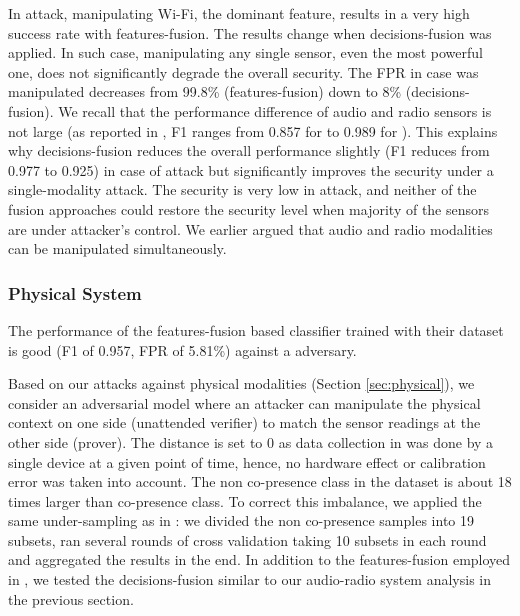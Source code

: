 In \singlemodal attack, manipulating Wi-Fi, the dominant feature, results in a
very high success rate with features-fusion. The results change when
decisions-fusion was applied.
In such case, manipulating any single sensor, even the most powerful one, does not
significantly degrade the overall security. The FPR in case \wifi was
manipulated decreases from 99.8\% (features-fusion) down to 8\% (decisions-fusion).
We recall that the performance difference of audio and radio sensors is not
large (as reported in \cite{TruongPerCom14}, F1 ranges from 0.857 for \audio to
0.989 for \wifi).
This explains why decisions-fusion reduces the overall performance 
slightly (F1 reduces from 0.977 to 0.925) in case of \zeromodal attack but
significantly improves the security under a single-modality attack. The
security is very low in \multimodal attack, and neither of the fusion
approaches could restore the security level when majority of the sensors are
under attacker's control.  
We earlier argued that audio and radio modalities can be manipulated simultaneously.









\subsubsection{Physical System}
 The performance of
the features-fusion based classifier trained with their dataset is good (F1 of
0.957, FPR of 5.81\%) against a \zeromodal adversary.

Based on our attacks against physical modalities (Section \ref{sec:physical}),
we consider an adversarial model where an attacker can manipulate the physical
context on one side (unattended verifier) to match the sensor readings at the
other side (prover). 
 The distance
is set to 0 as data collection in \cite{ShresthaFC2014} was done by a single
device at a given point of time, hence, no hardware effect or calibration error
was taken into account.  The non co-presence class in the dataset is about 18
times larger than co-presence class. To correct this imbalance, we applied the
same under-sampling as in \cite{ShresthaFC2014}: we divided the non co-presence
samples into 19 subsets, ran several rounds of cross validation taking 10
subsets in each round and aggregated the results in the end. In addition to
the features-fusion employed in \cite{ShresthaFC2014}, we tested the 
decisions-fusion similar to our audio-radio system analysis in the previous section.

